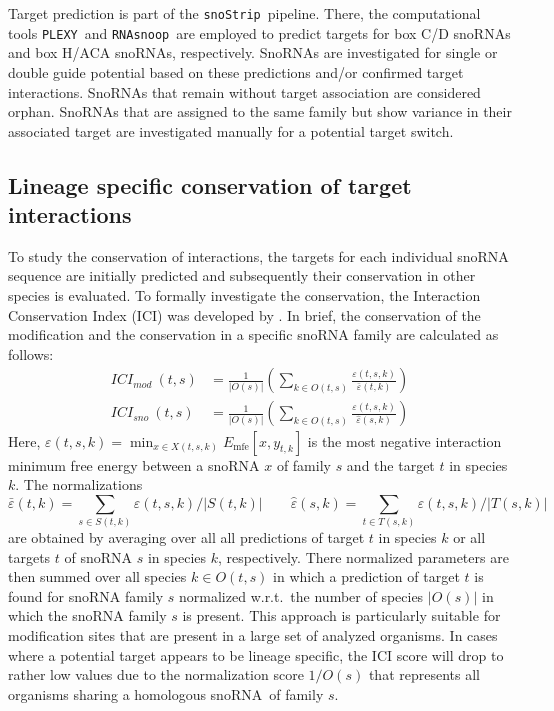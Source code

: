 \documentclass[preprint,3p,times,twocolumn]{elsarticle}
\newcommand{\sno}{snoRNA}
\newcommand{\cd}{box C/D snoRNA}
\newcommand{\haca}{box H/ACA snoRNA}
\newcommand{\snostrip}{\texttt{snoStrip}}
\newcommand{\plexy}{\texttt{PLEXY}}
\newcommand{\snoop}{\texttt{RNAsnoop}}
\begin{document}
Target prediction is part of the \snostrip\ pipeline. There, the
computational tools \plexy\ and \snoop\ are employed to predict
targets for \cd s and \haca s, respectively.  SnoRNAs are investigated
for single or double guide potential based on these predictions and/or
confirmed target interactions. SnoRNAs that remain without target
association are considered orphan. SnoRNAs that are assigned to the
same family but show variance in their associated target are
investigated manually for a potential target switch.

\subsection{Lineage specific conservation of target interactions}
To study the conservation of interactions, the targets for each
individual snoRNA sequence are initially predicted and subsequently
their conservation in other species is evaluated. To formally
investigate the conservation, the Interaction Conservation Index (ICI)
was developed by \cite{Kehr:2014}. In brief, the conservation of the
modification and the conservation in a specific snoRNA family are
calculated as follows:
\begin{equation}
  \begin{split}
    ICI_{mod}\:(t,s) & = \frac{1}{|O(s)|} \left( \sum_{k\in O(t,s)} \frac{\varepsilon(t,s,k)}{\bar\varepsilon(t,k)} \right) \\
    ICI_{sno}\:(t,s) & = \frac{1}{|O(s)|} \left( \sum_{k\in O(t,s)} \frac{\varepsilon(t,s,k)}{\hat\varepsilon(s,k)} \right)
  \end{split}
\end{equation}
Here, $ \varepsilon(t,s,k) = \min_{x\in X(t,s,k)}
E_{\textrm{mfe}}[x,y_{t,k}] $ is the most negative interaction minimum free
energy between a snoRNA $x$ of family $s$ and the target $t$ in species
$k$. The normalizations 
\begin{equation}
\bar\varepsilon(t,k)=\sum_{s\in
  S(t,k)}\varepsilon(t,s,k)/|S(t,k)| \qquad 
 \hat\varepsilon(s,k)=\sum_{t\in
  T(s,k)}\varepsilon(t,s,k)/|T(s,k)|
\end{equation}
are obtained by averaging over all all predictions of target $t$ in species
$k$ or all targets $t$ of snoRNA $s$ in species $k$, respectively.  There
normalized parameters are then summed over all species $k\in O(t,s)$ in
which a prediction of target $t$ is found for snoRNA family $s$ normalized
w.r.t.\ the number of species $|O(s)|$ in which the snoRNA family $s$ is
present. This approach is particularly suitable for modification sites that
are present in a large set of analyzed organisms. In cases where a
potential target appears to be lineage specific, the ICI score will drop to
rather low values due to the normalization score $1/O(s)$ that represents
all organisms sharing a homologous \sno\ of family $s$.
\end{document}
